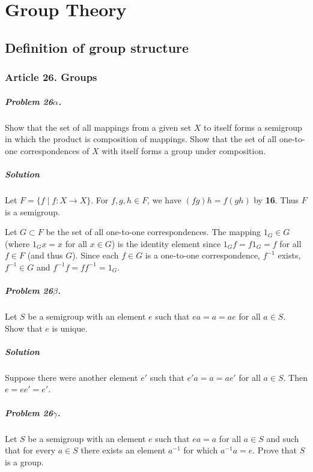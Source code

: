 \chapter{Group Theory}

\section{Definition of group structure}

\subsection{Article 26. Groups}

\paragraph{Problem 26$\alpha$.}
Show that the set of all mappings from a given set $X$ to itself forms a
semigroup in which the product is composition of mappings. Show that the
set of all one-to-one correspondences of $X$ with itself forms a group
under composition.

\paragraph*{Solution}
Let $F = \{ f \mid f : X \rightarrow X \}$. For $ f, g, h \in F$, we have
$(fg)h = f(gh)$ by \textbf{16}. Thus $F$ is a semigroup.

Let $ G \subset F$ be the set of all one-to-one correspondences. The mapping
$ 1_G \in G $ (where $1_G x = x$ for all $ x \in G$) is the identity element
since $1_G f = f 1_G = f $ for all $ f \in F$ (and thus $G$). Since each
$f \in G$ is a one-to-one correspondence, $ f^{-1} $ exists, $ f^{-1} \in G$ and
$f^{-1} f = f f^{-1} = 1_G$.

\paragraph{Problem 26$\beta$.}
Let $S$ be a semigroup with an element $e$ such that $ea = a = ae$ for all
$a \in S$. Show that $e$ is unique.

\paragraph*{Solution}
Suppose there were another element $e'$ such that $e'a = a = ae'$ for all
$a \in S$. Then $ e = ee' = e'$.

\paragraph{Problem 26$\gamma$.}
Let $S$ be a semigroup with an element $e$ such that $ea = a$ for all $a \in S$
and such that for every $a \in S$ there exists an element $a^{-1}$ for which
$a^{-1} a = e$. Prove that $S$ is a group.


